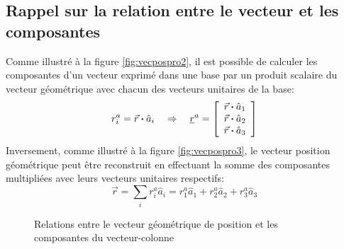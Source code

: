 \subsection{Rappel sur la relation entre le vecteur et les composantes}

Comme illustré à la figure \ref{fig:vecpospro2}, il est possible de calculer les composantes d'un vecteur exprimé dans une base par un produit scalaire du vecteur géométrique avec chacun des vecteurs unitaires de la base:
\begin{equation}
	r_i^a = \vec{r} \boldsymbol{\cdot} \hat{a}_i  \quad \Rightarrow \quad
	\underline{r}^{a} = \left[ \begin{array}{c} \vec{r} \boldsymbol{\cdot} \hat{a}_1 \\ \vec{r} \boldsymbol{\cdot} \hat{a}_2 \\ \vec{r} \boldsymbol{\cdot} \hat{a}_3  \end{array} \right]
\end{equation}
Inversement, comme illustré à la figure \ref{fig:vecpospro3}, le vecteur position géométrique peut être reconstruit en effectuant la somme des composantes multipliées avec leurs vecteurs unitaires respectifs:
\begin{equation}
	\vec{r} = \sum_{i} r_i^a \hat{a}_i = r_1^a \hat{a}_1 + r_2^a \hat{a}_2 + r_3^a \hat{a}_3%
\end{equation}
\begin{figure}[htb]
	\centering
	\hspace{+20pt}
	\caption{Relations entre le vecteur géométrique de position et les composantes du vecteur-colonne}
	\label{fig:vecpospro23}
\end{figure}


